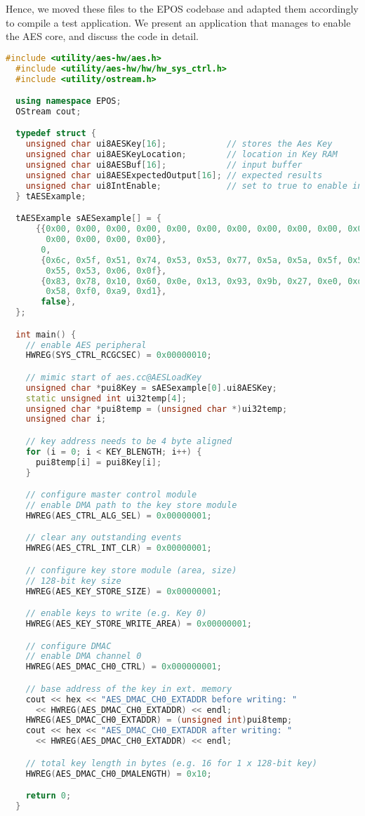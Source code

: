 \documentclass{../sftex/sftex}
\begin{document}
Hence, we moved these files to the EPOS codebase and adapted them
accordingly to compile a test application. We present an application that
manages to enable the AES core, and discuss the code in detail.

\begin{lstlisting}[language=C++,numbers=none]
  #include <utility/aes-hw/aes.h>
  #include <utility/aes-hw/hw/hw_sys_ctrl.h>
  #include <utility/ostream.h>

  using namespace EPOS;
  OStream cout;

  typedef struct {
    unsigned char ui8AESKey[16];            // stores the Aes Key
    unsigned char ui8AESKeyLocation;        // location in Key RAM
    unsigned char ui8AESBuf[16];            // input buffer
    unsigned char ui8AESExpectedOutput[16]; // expected results
    unsigned char ui8IntEnable;             // set to true to enable interrupts
  } tAESExample;

  tAESExample sAESexample[] = {
      {{0x00, 0x00, 0x00, 0x00, 0x00, 0x00, 0x00, 0x00, 0x00, 0x00, 0x00, 0x00,
        0x00, 0x00, 0x00, 0x00},
       0,
       {0x6c, 0x5f, 0x51, 0x74, 0x53, 0x53, 0x77, 0x5a, 0x5a, 0x5f, 0x57, 0x58,
        0x55, 0x53, 0x06, 0x0f},
       {0x83, 0x78, 0x10, 0x60, 0x0e, 0x13, 0x93, 0x9b, 0x27, 0xe0, 0xd7, 0xe4,
        0x58, 0xf0, 0xa9, 0xd1},
       false},
  };

  int main() {
    // enable AES peripheral
    HWREG(SYS_CTRL_RCGCSEC) = 0x00000010;

    // mimic start of aes.cc@AESLoadKey
    unsigned char *pui8Key = sAESexample[0].ui8AESKey;
    static unsigned int ui32temp[4];
    unsigned char *pui8temp = (unsigned char *)ui32temp;
    unsigned char i;

    // key address needs to be 4 byte aligned
    for (i = 0; i < KEY_BLENGTH; i++) {
      pui8temp[i] = pui8Key[i];
    }

    // configure master control module
    // enable DMA path to the key store module
    HWREG(AES_CTRL_ALG_SEL) = 0x00000001;

    // clear any outstanding events
    HWREG(AES_CTRL_INT_CLR) = 0x00000001;

    // configure key store module (area, size)
    // 128-bit key size
    HWREG(AES_KEY_STORE_SIZE) = 0x00000001;

    // enable keys to write (e.g. Key 0)
    HWREG(AES_KEY_STORE_WRITE_AREA) = 0x00000001;

    // configure DMAC
    // enable DMA channel 0
    HWREG(AES_DMAC_CH0_CTRL) = 0x000000001;

    // base address of the key in ext. memory
    cout << hex << "AES_DMAC_CH0_EXTADDR before writing: "
      << HWREG(AES_DMAC_CH0_EXTADDR) << endl;
    HWREG(AES_DMAC_CH0_EXTADDR) = (unsigned int)pui8temp;
    cout << hex << "AES_DMAC_CH0_EXTADDR after writing: "
      << HWREG(AES_DMAC_CH0_EXTADDR) << endl;

    // total key length in bytes (e.g. 16 for 1 x 128-bit key)
    HWREG(AES_DMAC_CH0_DMALENGTH) = 0x10;

    return 0;
  }
\end{lstlisting}
\end{document}
